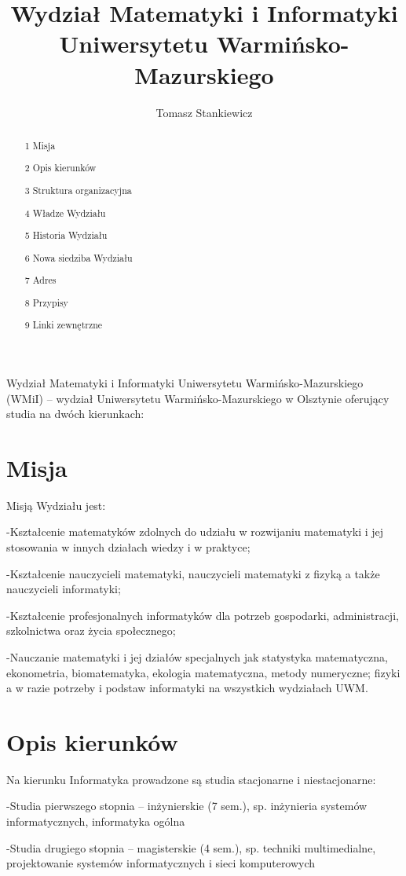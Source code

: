 \documentclass[a4paper,12pt]{article}
\title{Wydział Matematyki i Informatyki Uniwersytetu
Warmińsko-Mazurskiego}
\author{Tomasz Stankiewicz}
\begin{document}
\maketitle
Wydział Matematyki i Informatyki Uniwersytetu Warmińsko-Mazurskiego (WMiI) – wydział
Uniwersytetu Warmińsko-Mazurskiego w Olsztynie oferujący studia na dwóch kierunkach:


\begin{abstract}

1 Misja

2 Opis kierunków

3 Struktura organizacyjna

4 Władze Wydziału

5 Historia Wydziału

6 Nowa siedziba Wydziału

7 Adres

8 Przypisy

9 Linki zewnętrzne



\end{abstract}

\section{Misja}
Misją Wydziału jest:

-Kształcenie matematyków zdolnych do udziału w rozwijaniu matematyki i jej stosowania w innych
działach wiedzy i w praktyce;

-Kształcenie nauczycieli matematyki, nauczycieli matematyki z fizyką a także nauczycieli informatyki;

-Kształcenie profesjonalnych informatyków dla potrzeb gospodarki, administracji, szkolnictwa oraz życia
społecznego;

-Nauczanie matematyki i jej działów specjalnych jak statystyka matematyczna, ekonometria,
biomatematyka, ekologia matematyczna, metody numeryczne; fizyki a w razie potrzeby i podstaw
informatyki na wszystkich wydziałach UWM.

\section{Opis kierunków}
Na kierunku Informatyka prowadzone są studia stacjonarne i niestacjonarne:
\ 

-Studia pierwszego stopnia – inżynierskie (7 sem.), sp. inżynieria systemów informatycznych, informatyka
ogólna
\


-Studia drugiego stopnia – magisterskie (4 sem.), sp. techniki multimedialne, projektowanie systemów
informatycznych i sieci komputerowych
\ 
\end{document}
